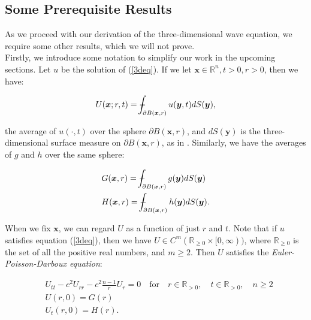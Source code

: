 \documentclass[a4paper, 12pt]{article}
\def\Xint#1{\mathchoice
{\XXint\displaystyle\textstyle{#1}}%
{\XXint\textstyle\scriptstyle{#1}}%
{\XXint\scriptstyle\scriptscriptstyle{#1}}%
{\XXint\scriptscriptstyle\scriptscriptstyle{#1}}%
\!\int}
\def\XXint#1#2#3{{\setbox0=\hbox{$#1{#2#3}{\int}$ }
\vcenter{\hbox{$#2#3$ }}\kern-.6\wd0}}
\def\dashint{\Xint-}
\numberwithin{equation}{section}
\begin{document}
\subsection{Some Prerequisite Results} \label{prereq}
As we proceed with our derivation of the three-dimensional wave equation, we require
some other results, which we will not prove. \\

Firstly, we introduce some notation to simplify our work in the upcoming
sections. Let $u$ be the solution of (\ref{3deq}). If we let $\boldsymbol{x}\in \mathbb{R}^n, t>0, r>0$, then we have:

\begin{equation} \label{averageU}
    U(\boldsymbol{x};r,t)=\dashint_{\partial B(\boldsymbol{x},r)}u(\boldsymbol{y},t)dS(\boldsymbol{y}),
\end{equation}

the average of $u(\cdot,t)$ over the sphere $\partial B(\boldsymbol{x},r)$, and
$dS(\boldsymbol{y})$ is the three-dimensional surface measure on $\partial B(\boldsymbol{x},r)$,
as in \cite[Ch. 2.4.1 b]{Ev}. Similarly, we have the averages of $g$ and $h$ over the same
sphere:

\begin{equation} \label{averageGH}
    \begin{aligned}
        &G(\boldsymbol{x},r)=\dashint_{\partial B(\boldsymbol{x},r)}g(\boldsymbol{y})dS(\boldsymbol{y})\\
        &H(\boldsymbol{x},r)=\dashint_{\partial B(\boldsymbol{x},r)}h(\boldsymbol{y})dS(\boldsymbol{y}).
    \end{aligned}
\end{equation}

When we fix $\boldsymbol{x}$, we can regard $U$ as a function of just $r$ and
$t$. Note that if $u$ satisfies equation (\ref{3deq}), then we have $U \in
C^m(\mathbb{R}_{\ge 0}\times[0,\infty))$, where $\mathbb{R}_{\ge 0}$ is the set
of all the positive real numbers, and $m \ge 2$. Then $U$ satisfies the \emph{Euler-Poisson-Darboux equation}:

\begin{equation} \label{EPDeq}
    \begin{aligned}
        &U_{tt}-c^2U_{rr}-c^2\frac{n-1}{r}U_r=0 \quad \textrm {for} \quad r \in \mathbb{R}_{>0}, \quad t \in \mathbb{R}_{>0}, \quad n \ge 2\\
        &U(r, 0)=G(r)\\
        &U_t(r,0)=H(r).
    \end{aligned}
\end{equation}
\\
\end{document}
